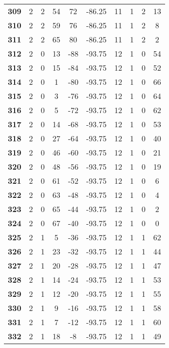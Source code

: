 \documentclass{article}%
\begin{document}
\begin{longtable}{cccccccccc}
        \textbf{309} & 2 & 2 & 54 & 72 & -86.25 & 11 & 1 & 2 & 13 \\ 
        \textbf{310} & 2 & 2 & 59 & 76 & -86.25 & 11 & 1 & 2 & 8 \\ 
        \textbf{311} & 2 & 2 & 65 & 80 & -86.25 & 11 & 1 & 2 & 2 \\ 
        \textbf{312} & 2 & 0 & 13 & -88 & -93.75 & 12 & 1 & 0 & 54 \\ 
        \textbf{313} & 2 & 0 & 15 & -84 & -93.75 & 12 & 1 & 0 & 52 \\ 
        \textbf{314} & 2 & 0 & 1 & -80 & -93.75 & 12 & 1 & 0 & 66 \\ 
        \textbf{315} & 2 & 0 & 3 & -76 & -93.75 & 12 & 1 & 0 & 64 \\ 
        \textbf{316} & 2 & 0 & 5 & -72 & -93.75 & 12 & 1 & 0 & 62 \\ 
        \textbf{317} & 2 & 0 & 14 & -68 & -93.75 & 12 & 1 & 0 & 53 \\ 
        \textbf{318} & 2 & 0 & 27 & -64 & -93.75 & 12 & 1 & 0 & 40 \\ 
        \textbf{319} & 2 & 0 & 46 & -60 & -93.75 & 12 & 1 & 0 & 21 \\ 
        \textbf{320} & 2 & 0 & 48 & -56 & -93.75 & 12 & 1 & 0 & 19 \\ 
        \textbf{321} & 2 & 0 & 61 & -52 & -93.75 & 12 & 1 & 0 & 6 \\ 
        \textbf{322} & 2 & 0 & 63 & -48 & -93.75 & 12 & 1 & 0 & 4 \\ 
        \textbf{323} & 2 & 0 & 65 & -44 & -93.75 & 12 & 1 & 0 & 2 \\ 
        \textbf{324} & 2 & 0 & 67 & -40 & -93.75 & 12 & 1 & 0 & 0 \\ 
        \textbf{325} & 2 & 1 & 5 & -36 & -93.75 & 12 & 1 & 1 & 62 \\ 
        \textbf{326} & 2 & 1 & 23 & -32 & -93.75 & 12 & 1 & 1 & 44 \\ 
        \textbf{327} & 2 & 1 & 20 & -28 & -93.75 & 12 & 1 & 1 & 47 \\ 
        \textbf{328} & 2 & 1 & 14 & -24 & -93.75 & 12 & 1 & 1 & 53 \\ 
        \textbf{329} & 2 & 1 & 12 & -20 & -93.75 & 12 & 1 & 1 & 55 \\ 
        \textbf{330} & 2 & 1 & 9 & -16 & -93.75 & 12 & 1 & 1 & 58 \\ 
        \textbf{331} & 2 & 1 & 7 & -12 & -93.75 & 12 & 1 & 1 & 60 \\ 
        \textbf{332} & 2 & 1 & 18 & -8 & -93.75 & 12 & 1 & 1 & 49 \\ 

\end{longtable}
\end{document}
